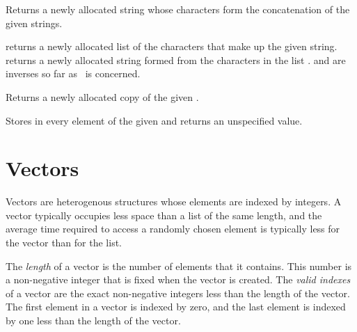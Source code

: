 \begin{entry}{%
}

Returns a newly allocated string whose characters form the concatenation of the
given strings.

\end{entry}


\begin{entry}{%
}

 returns a newly allocated list of the
characters that make up the given string.  
returns a newly allocated string formed from the characters in the list
.  and  are
inverses so far as \ is concerned.  

\end{entry}


\begin{entry}{%
}

Returns a newly allocated copy of the given .

\end{entry}


\begin{entry}{%
}

Stores  in every element of the given  and returns an
unspecified value.  %

\end{entry}


\section{Vectors}
\label{vectorsection}

Vectors are heterogenous structures whose elements are indexed
by integers.  A vector typically occupies less space than a list
of the same length, and the average time required to access a randomly
chosen element is typically less for the vector than for the list.

\vest The {\em length} of a vector is the number of elements that it
contains.  This number is a non-negative integer that is fixed when the
vector is created.  The {\em valid indexes} of a
vector are the exact non-negative integers less than the length of the
vector.  The first element in a vector is indexed by zero, and the last
element is indexed by one less than the length of the vector.

